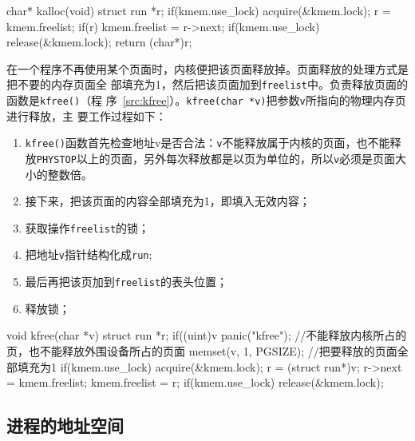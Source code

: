 \documentclass{swfcthesismscctex}
\begin{document}
\begin{listing}%
  \begin{codeblock}
\begin{ccode}
char* kalloc(void) {
  struct run *r;
  if(kmem.use_lock)
    acquire(&kmem.lock);
  r = kmem.freelist;
  if(r)
    kmem.freelist = r->next;
  if(kmem.use_lock)
    release(&kmem.lock);
  return (char*)r;
}
\end{ccode}
  \end{codeblock}
  \label{src:kalloc}
\end{listing}

在一个程序不再使用某个页面时，内核便把该页面释放掉。页面释放的处理方式是把不要的内存页面全
部填充为1，然后把该页面加到\texttt{freelist}中。负责释放页面的函数是\texttt{kfree()}（程
序~\ref{src:kfree}）。\texttt{kfree(char *v)}把参数\texttt{v}所指向的物理内存页进行释放，主
要工作过程如下：
\begin{enumerate}
\item \texttt{kfree()}函数首先检查地址v是否合法：\texttt{v}不能释放属于内核的页面，也不能释
  放\texttt{PHYSTOP}以上的页面，另外每次释放都是以页为单位的，所以\texttt{v}必须是页面大小的整数倍。
\item 接下来，把该页面的内容全部填充为1，即填入无效内容； 
\item 获取操作\texttt{freelist}的锁；
\item 把地址\texttt{v}指针结构化成\texttt{run};
\item 最后再把该页加到\texttt{freelist}的表头位置；
\item 释放锁；
\end{enumerate}

\begin{listing}
  \begin{codeblock}
\begin{ccode}
void kfree(char *v) {
  struct run *r;
  if((uint)v %
    panic("kfree"); //不能释放内核所占的页，也不能释放外围设备所占的页面
  memset(v, 1, PGSIZE); //把要释放的页面全部填充为1
  if(kmem.use_lock)
    acquire(&kmem.lock);
  r = (struct run*)v;
  r->next = kmem.freelist;
  kmem.freelist = r;
  if(kmem.use_lock)
    release(&kmem.lock);
}
\end{ccode}
  \end{codeblock}
  \label{src:kfree}
\end{listing}

\subsection{进程的地址空间}
\end{document}
